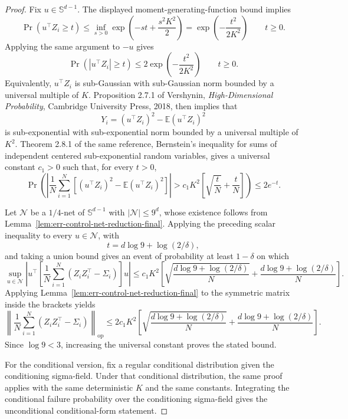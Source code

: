 \documentclass{article} %
\begin{document}
\begin{proof}
Fix \(u\in\mathbb{S}^{d-1}\).  The displayed moment-generating-function bound
implies
\[
\Pr(u^\top Z_i\ge t)
\le
\inf_{s>0}
\exp\!\left(-st+\frac{s^2K^2}{2}\right)
=
\exp\!\left(-\frac{t^2}{2K^2}\right)
\qquad t\ge0.
\]
Applying the same argument to \(-u\) gives
\[
\Pr(|u^\top Z_i|\ge t)
\le
2\exp\!\left(-\frac{t^2}{2K^2}\right)
\qquad t\ge0.
\]
Equivalently, \(u^\top Z_i\) is sub-Gaussian with sub-Gaussian norm bounded by
a universal multiple of \(K\).  Proposition 2.7.1 of Vershynin,
\emph{High-Dimensional Probability}, Cambridge University Press, 2018, then
implies that
\[
Y_i=(u^\top Z_i)^2-\mathbb{E}(u^\top Z_i)^2
\]
is sub-exponential with sub-exponential norm bounded by a universal multiple of
\(K^2\).  Theorem 2.8.1 of the same reference, Bernstein's inequality for sums
of independent centered sub-exponential random variables, gives a universal
constant \(c_1>0\) such that, for every \(t>0\),
\[
\Pr\!\left(
\left|
\frac1N\sum_{i=1}^N
\left[
(u^\top Z_i)^2-\mathbb{E}(u^\top Z_i)^2
\right]
\right|
>
c_1K^2
\left[
\sqrt{\frac{t}{N}}+\frac{t}{N}
\right]
\right)
\le
2e^{-t}.
\]

Let \(\mathcal{N}\) be a \(1/4\)-net of \(\mathbb{S}^{d-1}\) with
\(|\mathcal{N}|\le 9^d\), whose existence follows from
Lemma~\ref{lem:err-control-net-reduction-final}.  Applying the preceding scalar
inequality to every \(u\in\mathcal{N}\), with
\[
t=d\log 9+\log(2/\delta),
\]
and taking a union bound gives an event of probability at least \(1-\delta\) on
which
\[
\sup_{u\in\mathcal{N}}
\left|
u^\top
\left[
\frac1N\sum_{i=1}^N
\left(Z_iZ_i^\top-\Sigma_i\right)
\right]
u
\right|
\le
c_1K^2
\left[
\sqrt{\frac{d\log 9+\log(2/\delta)}{N}}
+
\frac{d\log 9+\log(2/\delta)}{N}
\right].
\]
Applying Lemma~\ref{lem:err-control-net-reduction-final} to the symmetric matrix
inside the brackets yields
\[
\left\|
\frac1N\sum_{i=1}^N
\left(Z_iZ_i^\top-\Sigma_i\right)
\right\|_{\mathrm{op}}
\le
2c_1K^2
\left[
\sqrt{\frac{d\log 9+\log(2/\delta)}{N}}
+
\frac{d\log 9+\log(2/\delta)}{N}
\right].
\]
Since \(\log 9<3\), increasing the universal constant proves the stated bound.

For the conditional version, fix a regular conditional distribution given the
conditioning sigma-field.  Under that conditional distribution, the same proof
applies with the same deterministic \(K\) and the same constants.  Integrating
the conditional failure probability over the conditioning sigma-field gives the
unconditional conditional-form statement.
\end{proof}
\end{document}
